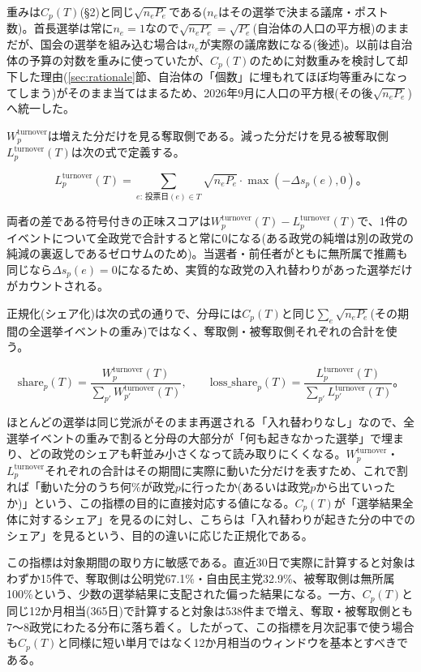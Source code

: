 \documentclass[a4paper,11pt]{ltjsarticle}
\begin{document}
重みは$C_p(T)$(\S2)と同じ$\sqrt{n_eP_e}$である($n_e$はその選挙で決まる議席・ポスト数)。首長選挙は常に$n_e=1$なので$\sqrt{n_eP_e}=\sqrt{P_e}$(自治体の人口の平方根)のままだが、国会の選挙を組み込む場合は$n_e$が実際の議席数になる(後述)。以前は自治体の予算の対数を重みに使っていたが、$C_p(T)$のために対数重みを検討して却下した理由(\ref{sec:rationale}節、自治体の「個数」に埋もれてほぼ均等重みになってしまう)がそのまま当てはまるため、2026年9月に人口の平方根(その後$\sqrt{n_eP_e}$)へ統一した。

$W_p^{\text{turnover}}$は増えた分だけを見る奪取側である。減った分だけを見る被奪取側$L_p^{\text{turnover}}(T)$は次の式で定義する。

\[
L_p^{\text{turnover}}(T) = \sum_{e:\,投票日(e)\in T} \sqrt{n_eP_e} \cdot \max(-\Delta s_p(e), 0)。
\]

両者の差である符号付きの正味スコアは$W_p^{\text{turnover}}(T) - L_p^{\text{turnover}}(T)$で、1件のイベントについて全政党で合計すると常に0になる(ある政党の純増は別の政党の純減の裏返しであるゼロサムのため)。当選者・前任者がともに無所属で推薦も同じなら$\Delta s_p(e)=0$になるため、実質的な政党の入れ替わりがあった選挙だけがカウントされる。

正規化(シェア化)は次の式の通りで、分母には$C_p(T)$と同じ$\sum_e\sqrt{n_eP_e}$(その期間の全選挙イベントの重み)ではなく、奪取側・被奪取側それぞれの合計を使う。

\[
\text{share}_p(T) = \frac{W_p^{\text{turnover}}(T)}{\displaystyle\sum_{p'} W_{p'}^{\text{turnover}}(T)}, \qquad
\text{loss\_share}_p(T) = \frac{L_p^{\text{turnover}}(T)}{\displaystyle\sum_{p'} L_{p'}^{\text{turnover}}(T)}。
\]

ほとんどの選挙は同じ党派がそのまま再選される「入れ替わりなし」なので、全選挙イベントの重みで割ると分母の大部分が「何も起きなかった選挙」で埋まり、どの政党のシェアも軒並み小さくなって読み取りにくくなる。$W_p^{\text{turnover}}$・$L_p^{\text{turnover}}$それぞれの合計はその期間に実際に動いた分だけを表すため、これで割れば「動いた分のうち何\%が政党$p$に行ったか(あるいは政党$p$から出ていったか)」という、この指標の目的に直接対応する値になる。$C_p(T)$が「選挙結果全体に対するシェア」を見るのに対し、こちらは「入れ替わりが起きた分の中でのシェア」を見るという、目的の違いに応じた正規化である。

この指標は対象期間の取り方に敏感である。直近30日で実際に計算すると対象はわずか15件で、奪取側は公明党67.1\%・自由民主党32.9\%、被奪取側は無所属100\%という、少数の選挙結果に支配された偏った結果になる。一方、$C_p(T)$と同じ12か月相当(365日)で計算すると対象は538件まで増え、奪取・被奪取側とも7〜8政党にわたる分布に落ち着く。したがって、この指標を月次記事で使う場合も$C_p(T)$と同様に短い単月ではなく12か月相当のウィンドウを基本とすべきである。
\end{document}
